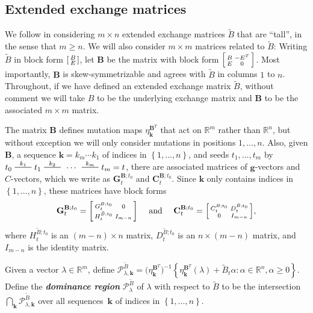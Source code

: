 \documentclass{amsart}
\theoremstyle{definition}
\theoremstyle{remark}
\numberwithin{equation}{section}
\newcommand{\newword}[1]{\textbf{\emph{#1}}}
\newcommand{\reals}{\mathbb R}
\newcommand{\edge}{\,\,\rule[2.7pt]{20pt}{0.5pt}\,\,}
\newcommand{\set}[1]{{\left\lbrace #1 \right\rbrace}}
\newcommand{\GG}{{\mathbf G}}
\newcommand{\CC}{{\mathbf C}}
\newcommand{\0}{{\mathbf{0}}}
\newcommand{\g}{\mathbf{g}}
\newcommand{\kk}{\mathbf{k}}
\newcommand{\tB}{{\tilde{B}}}
\newcommand{\BB}{\mathbf{B}}
\renewcommand{\H}{\mathcal{H}}
\renewcommand{\P}{\mathcal{P}}
\begin{document}
\subsection{Extended exchange matrices}\label{ext sec}
We follow \cite{FZ07} in considering $m\times n$ extended exchange matrices $\tB$ that are ``tall'', in the sense that $m\ge n$.
We will also consider $m\times m$ matrices related to $\tB$:
Writing $\tB$ in block form $\begin{bsmallmatrix}B\\E\end{bsmallmatrix}$, let $\BB$ be the matrix with block form $\begin{bsmallmatrix}B&-E^T\\E&0\end{bsmallmatrix}$.
Most importantly, $\BB$ is skew-symmetrizable and agrees with $\tB$ in columns $1$ to $n$.
Throughout, if we have defined an extended exchange matrix $\tB$, without comment we will take $B$ to be the underlying exchange matrix and $\BB$ to be the associated $m\times m$ matrix.

The matrix $\BB$ defines mutation maps $\eta_\kk^{\BB^T}$ that act on $\reals^m$ rather than $\reals^n$, but without exception we will only consider mutations in positions $1,\ldots,n$.
Also, given $\BB$, a sequence $\kk=k_m\cdots k_1$ of indices in $\set{1,\ldots,n}$, and seeds $t_1,\ldots,t_m$ by $t_0\overset{k_1}{\edge}t_1\overset{k_2}{\edge}\,\cdots\,\overset{k_m}{\edge}t_m=t$, there are associated matrices of $\g$-vectors and $C$-vectors, which we write as $\GG_t^{\BB;t_0}$ and $\CC_t^{\BB;t_0}$.
Since $\kk$ only contains indices in $\set{1,\ldots,n}$, these matrices have block forms
\[
\GG_t^{\BB;t_0}=\begin{bsmallmatrix}G_t^{B;t_0}&0\\H_t^{\tB;t_0}&I_{m-n}\end{bsmallmatrix}
\quad\text{ and }\quad
\CC_t^{\BB;t_0}=\begin{bsmallmatrix}C_t^{B;t_0}&D_t^{\tB;t_0}\\0&I_{m-n}\end{bsmallmatrix},
\]
where $H_t^{\tB;t_0}$ is an $(m-n)\times n$ matrix, $D_t^{\tB;t_0}$ is an $n\times(m-n)$ matrix, and $I_{m-n}$ is the identity matrix.

Given a vector $\lambda\in\reals^m$, define $\P^\tB_{\lambda,\kk}=\bigl(\eta_{\kk}^{\BB^T}\bigr)^{-1}\set{\eta_\kk^{\BB^T}(\lambda)+\tB_t\alpha:\alpha\in\reals^n,\alpha\ge0}$.
Define the \newword{dominance region} $\P^\tB_\lambda$ of $\lambda$ with respect to $\tB$ to be the intersection $\bigcap_\kk\P^\tB_{\lambda,\kk}$ over all sequences~$\kk$ of indices in $\set{1,\ldots,n}$.
\end{document}
